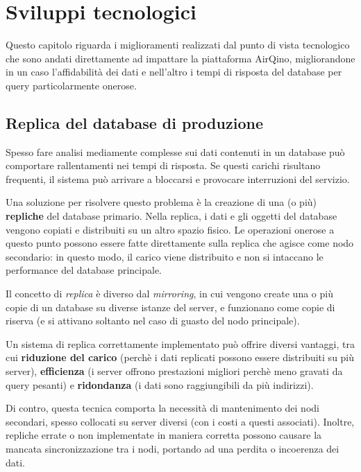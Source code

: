 \chapter{Sviluppi tecnologici}\label{ch:sviluppi}
Questo capitolo riguarda i miglioramenti realizzati dal punto di vista tecnologico che sono andati direttamente ad impattare la piattaforma AirQino, migliorandone in un caso l'affidabilità dei dati e nell'altro i tempi di risposta del database per query particolarmente onerose.

\section{Replica del database di produzione}\label{sec:replica}

Spesso fare analisi mediamente complesse sui dati contenuti in un database può comportare rallentamenti nei tempi di risposta. Se questi carichi risultano frequenti, il sistema può arrivare a bloccarsi e provocare interruzioni del servizio.

Una soluzione per risolvere questo problema è la creazione di una (o più) \textbf{repliche} del database primario. Nella replica, i dati e gli oggetti del database vengono copiati e distribuiti su un altro spazio fisico. Le operazioni onerose a questo punto possono essere fatte direttamente sulla replica che agisce come nodo secondario: in questo modo, il carico viene distribuito e non si intaccano le performance del database principale.

Il concetto di \textit{replica} è diverso dal \textit{mirroring}, in cui vengono create una o più copie di un database su diverse istanze del server, e funzionano come copie di riserva (e si attivano soltanto nel caso di guasto del nodo principale).

Un sistema di replica correttamente implementato può offrire diversi vantaggi, tra cui \textbf{riduzione del carico} (perchè i dati replicati possono essere distribuiti su più server), \textbf{efficienza} (i server offrono prestazioni migliori perchè meno gravati da query pesanti) e \textbf{ridondanza} (i dati sono raggiungibili da più indirizzi).

Di contro, questa tecnica comporta la necessità di mantenimento dei nodi secondari, spesso collocati su server diversi (con i costi a questi associati). Inoltre, repliche errate o non implementate in maniera corretta possono causare la mancata sincronizzazione tra i nodi, portando ad una perdita o incoerenza dei dati.


